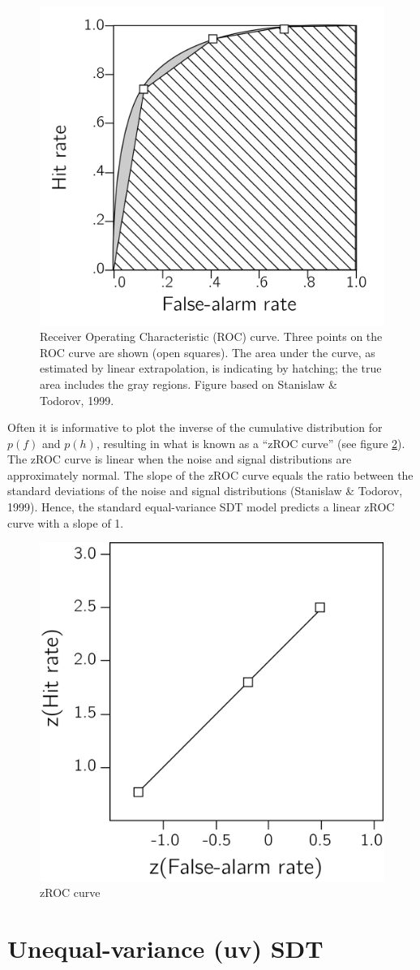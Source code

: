 \documentclass[12pt,twoside]{reedthesis}
\begin{document}
\begin{figure}
\includegraphics[width=0.6\linewidth]{figure/app-SDT/ROC_rep} \caption[Receiver Operative Characteristic (ROC) curve]{Receiver Operating Characteristic (ROC) curve. Three points on the ROC curve are shown (open squares). The area under the curve, as estimated by linear extrapolation, is indicating by hatching; the true area includes the gray regions. Figure based on Stanislaw \& Todorov, 1999.}\label{fig:app1-ROC}
\end{figure}
Often it is informative to plot the inverse of the cumulative distribution for \(p(f)\) and \(p(h)\), resulting in what is known as a ``zROC curve'' (see figure \ref{fig:app1-zROC}). The zROC curve is linear when the noise and signal distributions are approximately normal. The slope of the zROC curve equals the ratio between the standard deviations of the noise and signal distributions (Stanislaw \& Todorov, 1999). Hence, the standard equal-variance SDT model predicts a linear zROC curve with a slope of 1.
\begin{figure}
\includegraphics[width=0.6\linewidth]{figure/app-SDT/zROC_rep} \caption{zROC curve}\label{fig:app1-zROC}
\end{figure}
\hypertarget{app1-uvSDT}{%
\section{Unequal-variance (uv) SDT}\label{app1-uvSDT}}
\end{document}

